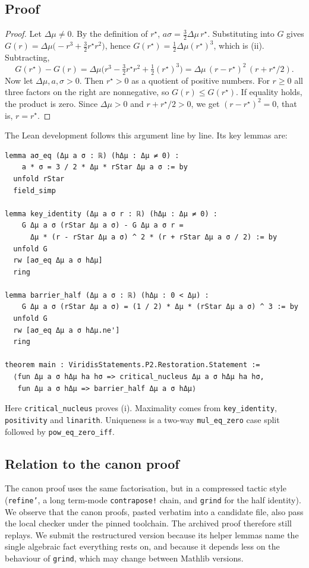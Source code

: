 \documentclass[11pt]{article}
\theoremstyle{definition}
\theoremstyle{remark}
\begin{document}
\subsection{Proof}
\begin{proof}
Let $\Delta\mu\ne0$. By the definition of $r^\star$, $a\sigma=\tfrac32\Delta\mu\, r^\star$.
Substituting into $G$ gives $G(r)=\Delta\mu\bigl(-r^3+\tfrac32 r^\star r^2\bigr)$, hence
$G(r^\star)=\tfrac12\Delta\mu (r^\star)^3$, which is (ii). Subtracting,
\[
G(r^\star)-G(r)=\Delta\mu\bigl(r^3-\tfrac32 r^\star r^2+\tfrac12 (r^\star)^3\bigr)=\Delta\mu\,(r-r^\star)^2\,(r+r^\star/2).
\]
Now let $\Delta\mu,a,\sigma>0$. Then $r^\star>0$ as a quotient of positive numbers.
For $r\ge0$ all three factors on the right are nonnegative, so $G(r)\le G(r^\star)$.
If equality holds, the product is zero. Since $\Delta\mu>0$ and $r+r^\star/2>0$, we get $(r-r^\star)^2=0$, that is, $r=r^\star$.
\end{proof}
The Lean development follows this argument line by line. Its key lemmas are:
\begin{lstlisting}
lemma aσ_eq (Δμ a σ : ℝ) (hΔμ : Δμ ≠ 0) :
    a * σ = 3 / 2 * Δμ * rStar Δμ a σ := by
  unfold rStar
  field_simp

lemma key_identity (Δμ a σ r : ℝ) (hΔμ : Δμ ≠ 0) :
    G Δμ a σ (rStar Δμ a σ) - G Δμ a σ r =
      Δμ * (r - rStar Δμ a σ) ^ 2 * (r + rStar Δμ a σ / 2) := by
  unfold G
  rw [aσ_eq Δμ a σ hΔμ]
  ring

lemma barrier_half (Δμ a σ : ℝ) (hΔμ : 0 < Δμ) :
    G Δμ a σ (rStar Δμ a σ) = (1 / 2) * Δμ * (rStar Δμ a σ) ^ 3 := by
  unfold G
  rw [aσ_eq Δμ a σ hΔμ.ne']
  ring

theorem main : ViridisStatements.P2.Restoration.Statement :=
  ⟨fun Δμ a σ hΔμ ha hσ => critical_nucleus Δμ a σ hΔμ ha hσ,
   fun Δμ a σ hΔμ => barrier_half Δμ a σ hΔμ⟩
\end{lstlisting}
Here \texttt{critical\_nucleus} proves (i). Maximality comes from \texttt{key\_identity}, \texttt{positivity} and \texttt{linarith}.
Uniqueness is a two-way \texttt{mul\_eq\_zero} case split followed by \texttt{pow\_eq\_zero\_iff}.

\subsection{Relation to the canon proof}
The canon proof uses the same factorisation, but in a compressed tactic style (\texttt{refine'}, a long term-mode
\texttt{contrapose!} chain, and \texttt{grind} for the half identity).
We observe that the canon proofs, pasted verbatim into a candidate file, also pass the local checker under the pinned
toolchain. The archived proof therefore still replays.
We submit the restructured version because its helper lemmas name the single algebraic fact everything rests on,
and because it depends less on the behaviour of \texttt{grind}, which may change between Mathlib versions.
\end{document}
